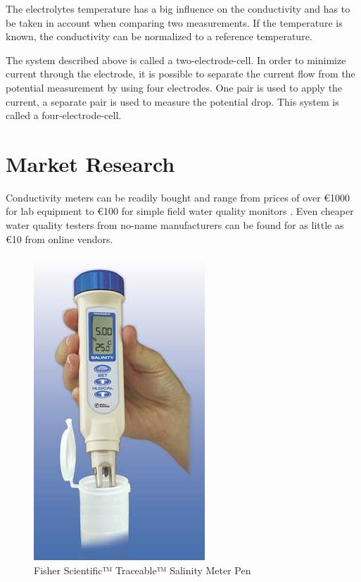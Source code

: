 The electrolytes temperature has a big influence on the conductivity and has to be taken in account when comparing two measurements. If the temperature is known, the conductivity can be normalized to a reference temperature.

The system described above is called a two-electrode-cell. In order to minimize current through the electrode, it is possible to separate the current flow from the potential measurement by using four electrodes. One pair is used to apply the current, a separate pair is used to measure the potential drop. This system is called a four-electrode-cell.

\section{Market Research}

Conductivity meters can be readily bought and range from prices of over \euro{1000} for lab equipment \cite{expcm} to \euro{100} for simple field water quality monitors \cite{cheapcm}. Even cheaper water quality testers from no-name manufacturers can be found for as little as \euro{10} from online vendors.

\begin{figure}
	\begin{center}
    	\tikzset{external/export next=false}
		\includegraphics[scale=0.5]{images/ccm.jpg}
		\caption{Fisher Scientific™ Traceable™ Salinity Meter Pen \cite{cheapcm}}
		\label{fig:ccm}
	\end{center}
\end{figure}

